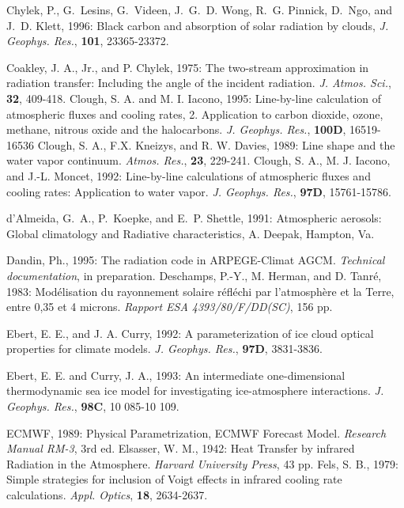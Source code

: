 \decrefname
Chylek, P., G.~Lesins, G.~Videen, J.~G.~D. Wong, R.~G. Pinnick, D.~Ngo, and
  J.~D. Klett, 1996: Black carbon and absorption of solar radiation by clouds,
 {\it J. Geophys. Res.}, {\bf 101}, 23365-23372.

\decrefname
Coakley, J. A., Jr., and P. Chylek, 1975:
      The two-stream approximation in radiation transfer: Including the angle
      of the incident radiation.
      {\it J. Atmos. Sci.},
      {\bf 32},
      409-418.
\decrefname
Clough, S. A. and M. I. Iacono, 1995: Line-by-line calculation of atmospheric fluxes and cooling rates, 2. Application to carbon dioxide, ozone, methane, nitrous oxide and the halocarbons.
 {\it J. Geophys. Res.},
 {\bf  100D},
 16519-16536
\decrefname
Clough, S. A., F.X. Kneizys, and R. W. Davies, 1989:
Line shape and the water vapor continuum.
 {\it Atmos. Res.},
 {\bf 23},
 229-241.
\decrefname
Clough, S. A., M. J. Iacono, and J.-L. Moncet, 1992: Line-by-line calculations of atmospheric fluxes and cooling rates: Application to water vapor.
 {\it J. Geophys. Res.},
 {\bf  97D},
15761-15786.

\decrefname
d'Almeida, G.~A., P.~Koepke, and E.~P. Shettle, 1991: Atmospheric aerosols:
  Global climatology and Radiative characteristics, A. Deepak, Hampton, Va.


\decrefname
Dandin, Ph., 1995:
      The radiation code in ARPEGE-Climat AGCM.
      {\it Technical documentation},
      in preparation.
\decrefname
Deschamps, P.-Y., M. Herman, and D. Tanr\'e, 1983:
      Mod\'elisation du rayonnement solaire r\'efl\'echi par l'atmosph\`ere et
      la Terre, entre 0,35 et 4 microns.
      {\it Rapport ESA 4393/80/F/DD(SC)},
      156 pp.

\decrefname
Ebert, E. E., and J. A. Curry, 1992:
      A parameterization of ice cloud optical properties for climate models.
      {\it J. Geophys. Res.},
      {\bf 97D},
      3831-3836.

\decrefname
Ebert, E. E. and Curry, J. A., 1993: An intermediate one-dimensional thermodynamic sea ice model for investigating ice-atmosphere interactions.
{\it  J. Geophys. Res.}, {\bf 98C}, 10 085-10 109.

\decrefname
ECMWF, 1989:
      Physical Parametrization, ECMWF Forecast Model.
      {\it Research Manual RM-3},
      3rd ed.
\decrefname
Elsasser, W. M., 1942:
      Heat Transfer by infrared Radiation in the Atmosphere.
      {\it Harvard University Press},
      43 pp.
\decrefname
Fels, S. B., 1979: Simple strategies for inclusion of Voigt effects in infrared cooling rate calculations.
 {\it Appl. Optics},
 {\bf 18},
 2634-2637.

